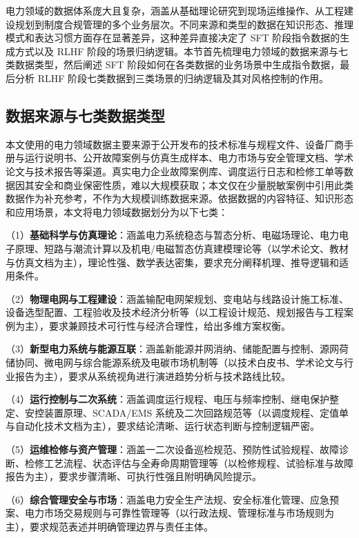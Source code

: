 \documentclass[fontset=fandol,type=master,campus=shenzhen,etitleauto=true]{hithesisbook}
\begin{document}
电力领域的数据体系庞大且复杂，涵盖从基础理论研究到现场运维操作、从工程建设规划到制度合规管理的多个业务层次。不同来源和类型的数据在知识形态、推理模式和表达习惯方面存在显著差异，这种差异直接决定了 SFT 阶段指令数据的生成方式以及 RLHF 阶段的场景归纳逻辑。本节首先梳理电力领域的数据来源与七类数据类型，然后阐述 SFT 阶段如何在各类数据的业务场景中生成指令数据，最后分析 RLHF 阶段七类数据到三类场景的归纳逻辑及其对风格控制的作用。

\subsection{数据来源与七类数据类型}\label{ux6570ux636eux6765ux6e90ux4e0eux4e03ux7c7bux6570ux636eux7c7bux578b}

本文使用的电力领域数据主要来源于公开发布的技术标准与规程文件、设备厂商手册与运行说明书、公开故障案例与仿真生成样本、电力市场与安全管理文档、学术论文与技术报告等渠道。真实电力企业故障案例库、调度运行日志和检修工单等数据因其安全和商业保密性质，难以大规模获取；本文仅在少量脱敏案例中引用此类数据作为补充参考，不作为大规模训练数据来源。依据数据的内容特征、知识形态和应用场景，本文将电力领域数据划分为以下七类：

\noindent （1）\textbf{基础科学与仿真理论}：涵盖电力系统稳态与暂态分析、电磁场理论、电力电子原理、短路与潮流计算以及机电/电磁暂态仿真建模理论等（以学术论文、教材与仿真文档为主），理论性强、数学表达密集，要求充分阐释机理、推导逻辑和适用条件。

\noindent （2）\textbf{物理电网与工程建设}：涵盖输配电网架规划、变电站与线路设计施工标准、设备选型配置、工程验收及技术经济分析等（以工程设计规范、规划报告与工程案例为主），要求兼顾技术可行性与经济合理性，给出多维方案权衡。

\noindent （3）\textbf{新型电力系统与能源互联}：涵盖新能源并网消纳、储能配置与控制、源网荷储协同、微电网与综合能源系统及电碳市场机制等（以技术白皮书、学术论文与行业报告为主），要求从系统视角进行演进趋势分析与技术路线比较。

\noindent （4）\textbf{运行控制与二次系统}：涵盖调度运行规程、电压与频率控制、继电保护整定、安控装置原理、SCADA/EMS 系统及二次回路规范等（以调度规程、定值单与自动化技术文档为主），要求结论清晰、运行状态判断与控制逻辑严密。

\noindent （5）\textbf{运维检修与资产管理}：涵盖一二次设备巡检规范、预防性试验规程、故障诊断、检修工艺流程、状态评估与全寿命周期管理等（以检修规程、试验标准与故障报告为主），要求步骤清晰、可执行性强且附明确风险提示。

\noindent （6）\textbf{综合管理安全与市场}：涵盖电力安全生产法规、安全标准化管理、应急预案、电力市场交易规则与可靠性管理等（以行政法规、管理标准与市场规则为主），要求规范表述并明确管理边界与责任主体。
\end{document}
